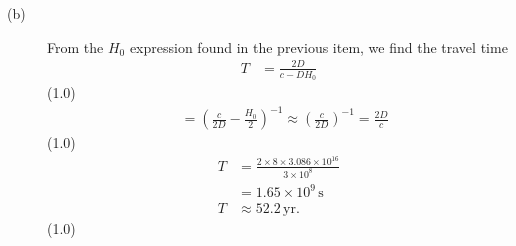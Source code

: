 \begin{description}
\item[(b)] From the $H_0$ expression found in the previous item, we find
  the travel time
  \begin{align*}
  T &= \frac{2D}{c - DH_0}
  \end{align*}
  \hfill(1.0)
  \begin{align*}
  &= \left(\frac{c}{2D} - \frac{H_0}{2}\right)^{-1}
   \approx \left(\frac{c}{2D}\right)^{-1} = \frac{2D}{c}
  \end{align*}
  \hfill(1.0)
  \begin{align*}
  T &= \frac{2\times 8\times 3.086\times 10^{16}}{3\times 10^{8}}\\
    &= 1.65\times 10^{9}\,\mathrm{s}\\
  T &\approx 52.2\,\mathrm{yr}.
  \end{align*}
  \hfill(1.0)
\end{description}
